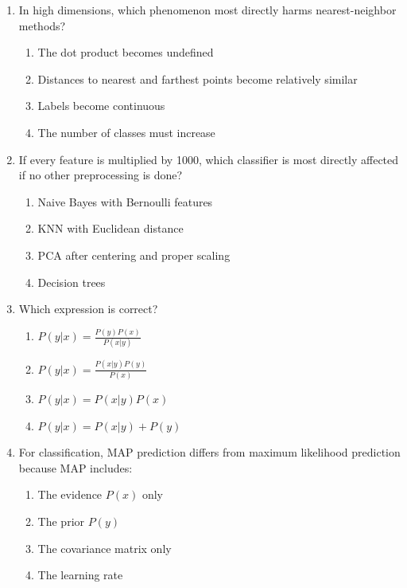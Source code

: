 \documentclass[11pt]{article}
\newcommand{\cmark}{\ding{51}}
\begin{document}
\begin{enumerate}[leftmargin=*]
\item In high dimensions, which phenomenon most directly harms nearest-neighbor methods?

\begin{enumerate}[label=\Alph*.]
    \item The dot product becomes undefined
    \item Distances to nearest and farthest points become relatively similar \cmark
    \item Labels become continuous
    \item The number of classes must increase
\end{enumerate}

\item If every feature is multiplied by 1000, which classifier is most directly affected if no other preprocessing is done?

\begin{enumerate}[label=\Alph*.]
    \item Naive Bayes with Bernoulli features
    \item KNN with Euclidean distance \cmark
    \item PCA after centering and proper scaling
    \item Decision trees
\end{enumerate}

\item Which expression is correct?

\begin{enumerate}[label=\Alph*.]
    \item $P(y|x)=\frac{P(y)P(x)}{P(x|y)}$
    \item $P(y|x)=\frac{P(x|y)P(y)}{P(x)}$ \cmark
    \item $P(y|x)=P(x|y)P(x)$
    \item $P(y|x)=P(x|y)+P(y)$
\end{enumerate}

\item For classification, MAP prediction differs from maximum likelihood prediction because MAP includes:

\begin{enumerate}[label=\Alph*.]
    \item The evidence $P(x)$ only
    \item The prior $P(y)$ \cmark
    \item The covariance matrix only
    \item The learning rate
\end{enumerate}


\end{enumerate}
\end{document}
